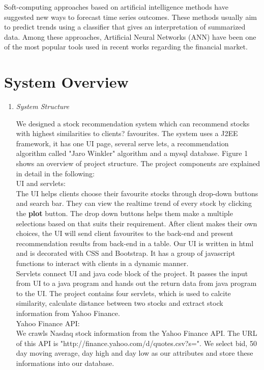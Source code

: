 \documentclass[10pt, conference, compsocconf]{IEEEtran}
\begin{document}
Soft-computing approaches based on artificial intelligence methods have suggested new ways to forecast time series outcomes\cite{Fast}. These methods usually aim to predict trends using a classifier that gives an interpretation of summarized data. Among these approaches, Artificial Neural Networks (ANN) have been one of the most popular tools used in recent works regarding the financial market.



\section{System Overview}
\begin{enumerate}[label=\Alph*]

\item \textit{System Structure}

 We designed a stock recommendation system which can recommend stocks with highest similarities to clients? favourites. The system uses a J2EE     framework, it has one UI page,  several serve lets, a recommendation algorithm called "Jaro Winkler" algorithm  and a mysql database. Figure 1 shows an overview of project structure. The project components are explained in detail in the following:\\
           
           UI and servlets:\\
           The UI helps clients choose their favourite stocks through drop-down buttons and search bar. They can view the realtime trend of every stock by clicking the \textbf{plot} button. The drop down buttons helps them make a multiple selections based on that suits their requirement. After client makes their own choices, the UI will send client favourites to the back-end and present recommendation results from back-end in a table. Our  UI is written in html and is decorated with  CSS and Bootstrap. It has a group of javascript functions to interact with clients in a dynamic manner.\\
Servlets connect UI and java code block of the project. It passes the input from UI to a java program and hands out the return data from java program to the UI. The project contains four servlets, which is used to calcite similarity, calculate distance between two stocks and extract stock information from Yahoo Finance.\\ 

          Yahoo Finance API:\\
           We crawls Nasdaq stock information from the Yahoo Finance API. The URL of this API is "http://finance.yahoo.com/d/quotes.csv?s=". We select bid, 50 day moving average, day high and day low as our attributes and store these informations into our database.\\
                         

\end{enumerate}
\end{document}
